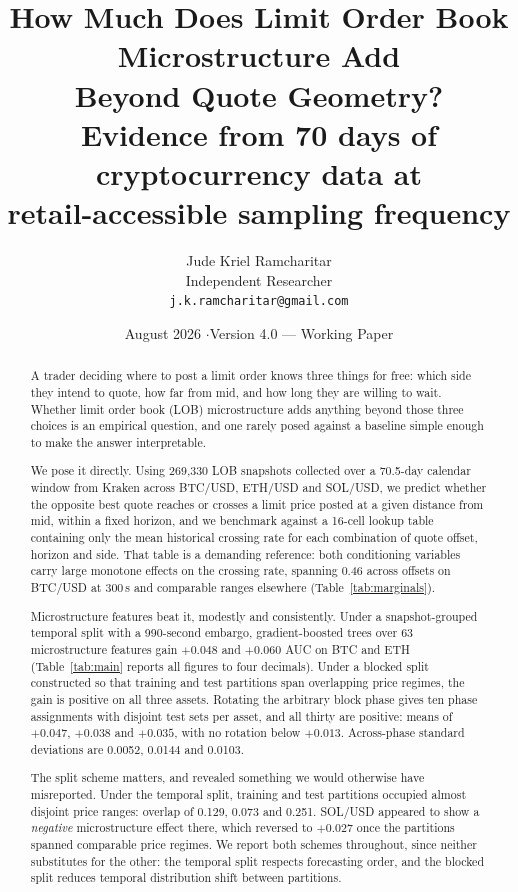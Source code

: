 \documentclass[11pt]{article}
\title{\textbf{How Much Does Limit Order Book Microstructure Add\\
Beyond Quote Geometry?}\\[0.4em]
\large Evidence from 70 days of cryptocurrency data at\\
retail-accessible sampling frequency}
\author{Jude Kriel Ramcharitar\\
\small Independent Researcher\\
\small \texttt{j.k.ramcharitar@gmail.com}}
\date{August 2026 \quad$\cdot$\quad Version 4.0 --- Working Paper}
\begin{document}
\maketitle

\begin{abstract}
\noindent
A trader deciding where to post a limit order knows three things for free:
which side they intend to quote, how far from mid, and how long they are
willing to wait.
Whether limit order book (LOB) microstructure adds anything beyond those three
choices is an empirical question, and one rarely posed against a baseline
simple enough to make the answer interpretable.

We pose it directly. Using 269{,}330 LOB snapshots collected over a 70.5-day
calendar window from Kraken across BTC/USD, ETH/USD and SOL/USD, we predict whether the opposite best quote
reaches or crosses a limit price posted at a given distance from mid, within a
fixed horizon, and we benchmark against a 16-cell lookup table containing only the
mean historical crossing rate for each combination of quote offset, horizon and
side. That table is a demanding reference: both conditioning variables carry large
monotone effects on the crossing rate, spanning 0.46 across offsets on BTC/USD at
300\,s and comparable ranges elsewhere (Table~\ref{tab:marginals}).

Microstructure features beat it, modestly and consistently. Under a
snapshot-grouped temporal split with a 990-second embargo, gradient-boosted
trees over 63 microstructure features gain $+0.048$ and $+0.060$ AUC on BTC and
ETH (Table~\ref{tab:main} reports all figures to four decimals). Under a blocked split constructed so that training and test partitions
span overlapping price regimes, the gain is positive on all three assets.
Rotating the arbitrary block phase gives ten phase assignments with disjoint
test sets per asset, and all thirty are positive: means of $+0.047$, $+0.038$
and $+0.035$, with no rotation below $+0.013$. Across-phase standard deviations
are 0.0052, 0.0144 and 0.0103.

The split scheme matters, and revealed something we would otherwise have
misreported. Under the temporal split, training and test partitions occupied
almost disjoint price ranges: overlap of 0.129, 0.073 and 0.251. SOL/USD
appeared to show a \emph{negative} microstructure effect there, which reversed
to $+0.027$ once the partitions spanned comparable price regimes. We report
both schemes throughout, since neither substitutes for the other: the temporal
split respects forecasting order, and the blocked split reduces temporal
distribution shift between partitions.


\end{abstract}
\end{document}
